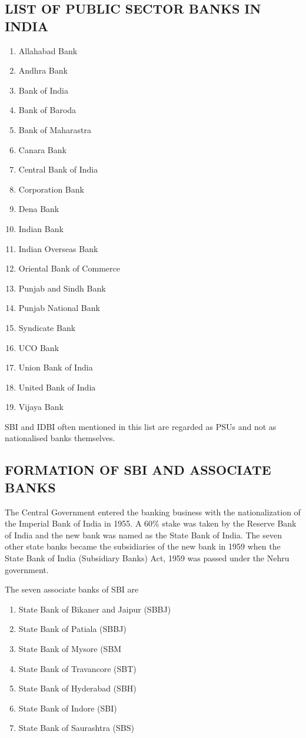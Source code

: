 \documentclass[a4paper, 14pt]{article}
\begin{document}
{\subsection{LIST OF PUBLIC SECTOR BANKS IN INDIA}
\begin{enumerate}
\item Allahabad Bank
\item Andhra Bank
\item Bank of India
\item Bank of Baroda
\item Bank of Maharastra
\item Canara Bank
\item Central Bank of India
\item Corporation Bank
\item Dena Bank
\item Indian Bank
\item Indian Overseas Bank
\item Oriental Bank of Commerce
\item Punjab and Sindh Bank
\item Punjab National Bank
\item Syndicate Bank
\item UCO Bank
\item Union Bank of India
\item United Bank of India
\item Vijaya Bank
\end{enumerate}
\par SBI and IDBI often mentioned in this list are regarded as PSUs and not as nationalised banks themselves.

\subsection{FORMATION OF SBI AND ASSOCIATE BANKS}
\par The Central Government entered the banking business with the nationalization of the Imperial Bank of India in 1955. A 60\% stake was taken by the Reserve Bank of India and the new bank was named as the State Bank of India. The seven other state banks became the subsidiaries of the new bank in 1959 when the State Bank of India (Subsidiary Banks) Act, 1959 was passed under the Nehru government.

The seven associate banks of SBI are
\begin{enumerate}
\item State Bank of Bikaner and Jaipur (SBBJ)
\item State Bank of Patiala (SBBJ)
\item State Bank of Mysore (SBM
\item State Bank of Travancore (SBT)
\item State Bank of Hyderabad (SBH)
\item State Bank of Indore (SBI)
\item State Bank of Saurashtra (SBS)
\end{enumerate}

}
\end{document}
